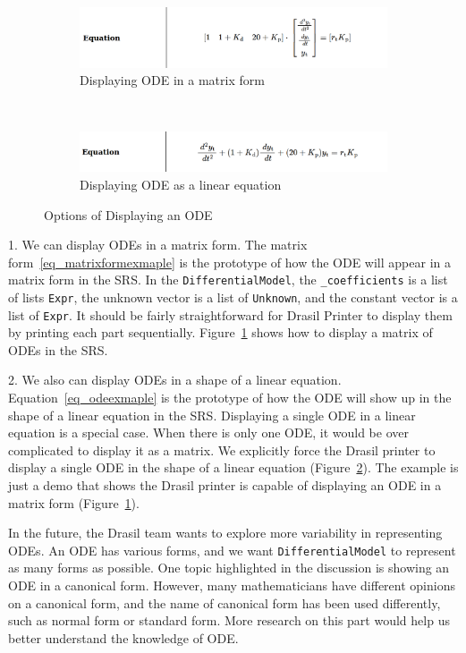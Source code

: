 \begin{figure}[ht]
	\centering
	\begin{subfigure}[t]{\textwidth}
		\centering
		
\includegraphics[width=1\textwidth]{figures/ODEInMatrix.png}
		\caption{Displaying ODE in a matrix form}
		\label{fig_multienv_odematrix}
	\end{subfigure}
	~
	\begin{subfigure}[t]{\textwidth}
		\centering
	
\includegraphics[width=1\textwidth]{figures/ODEInLinearEq.png}
		\caption{Displaying ODE as a linear equation}
		\label{fig_multienv_odelinear}
	\end{subfigure}
	
	\caption{Options of Displaying an ODE}
	\label{fig_multienv}
\end{figure}

1. We can display ODEs in a matrix form. The matrix form~\ref{eq_matrixformexmaple} is the prototype of how the ODE will appear in a matrix form in the SRS. In the \verb|DifferentialModel|, the \verb|_coefficients| is a list of lists \verb|Expr|, the unknown vector is a list of \verb|Unknown|, and the constant vector is a list of \verb|Expr|. It should be fairly straightforward for Drasil Printer to display them by printing each part sequentially. Figure~\ref{fig_multienv_odematrix} shows how to display a matrix of ODEs in the SRS. 

2. We also can display ODEs in a shape of a linear equation. Equation~\ref{eq_odeexmaple} is the prototype of how the ODE will show up in the shape of a linear equation in the SRS. Displaying a single ODE in a linear equation is a special case. When there is only one ODE, it would be over complicated to display it as a matrix. We explicitly force the Drasil printer to display a single ODE in the shape of a linear equation (Figure~\ref{fig_multienv_odelinear}). The example is just a demo that shows the Drasil printer is capable of displaying an ODE in a matrix form (Figure~\ref{fig_multienv_odematrix}).

In the future, the Drasil team wants to explore more variability in representing ODEs. An ODE has various forms, and we want \verb|DifferentialModel| to represent as many forms as possible. One topic highlighted in the discussion is showing an ODE in a canonical form. However, many mathematicians have different opinions on a canonical form, and the name of canonical form has been used differently, such as normal form or standard form. More research on this part would help us better understand the knowledge of ODE.

